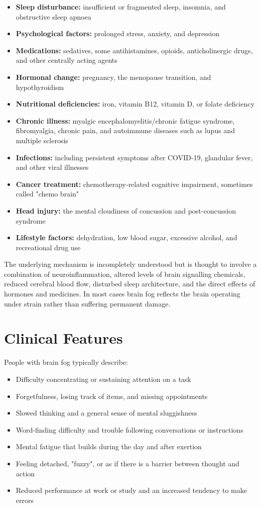 \begin{itemize}
    \item \textbf{Sleep disturbance:} insufficient or fragmented sleep, insomnia, and obstructive sleep apnoea
    \item \textbf{Psychological factors:} prolonged stress, anxiety, and depression
    \item \textbf{Medications:} sedatives, some antihistamines, opioids, anticholinergic drugs, and other centrally acting agents
    \item \textbf{Hormonal change:} pregnancy, the menopause transition, and hypothyroidism
    \item \textbf{Nutritional deficiencies:} iron, vitamin B12, vitamin D, or folate deficiency
    \item \textbf{Chronic illness:} myalgic encephalomyelitis/chronic fatigue syndrome, fibromyalgia, chronic pain, and autoimmune diseases such as lupus and multiple sclerosis
    \item \textbf{Infections:} including persistent symptoms after COVID-19, glandular fever, and other viral illnesses
    \item \textbf{Cancer treatment:} chemotherapy-related cognitive impairment, sometimes called "chemo brain"
    \item \textbf{Head injury:} the mental cloudiness of concussion and post-concussion syndrome
    \item \textbf{Lifestyle factors:} dehydration, low blood sugar, excessive alcohol, and recreational drug use
\end{itemize}

The underlying mechanism is incompletely understood but is thought to involve a combination of neuroinflammation, altered levels of brain signalling chemicals, reduced cerebral blood flow, disturbed sleep architecture, and the direct effects of hormones and medicines. In most cases brain fog reflects the brain operating under strain rather than suffering permanent damage.

\section*{Clinical Features}
People with brain fog typically describe:

\begin{itemize}
    \item Difficulty concentrating or sustaining attention on a task
    \item Forgetfulness, losing track of items, and missing appointments
    \item Slowed thinking and a general sense of mental sluggishness
    \item Word-finding difficulty and trouble following conversations or instructions
    \item Mental fatigue that builds during the day and after exertion
    \item Feeling detached, "fuzzy", or as if there is a barrier between thought and action
    \item Reduced performance at work or study and an increased tendency to make errors
\end{itemize}

